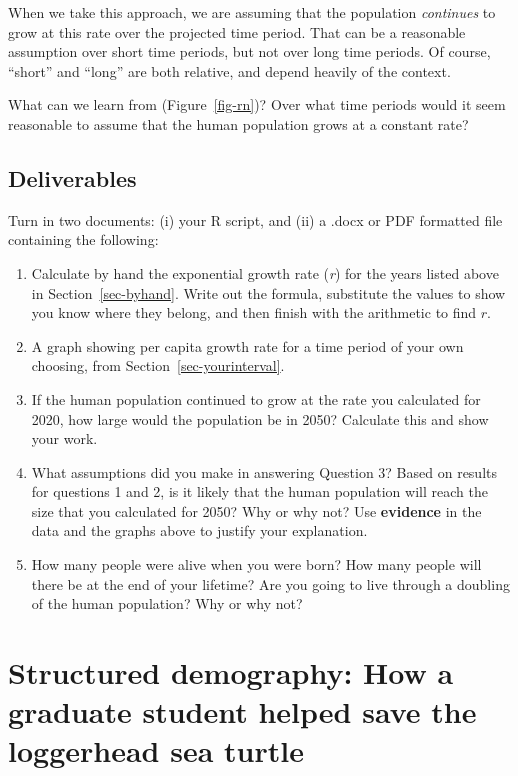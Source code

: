 \documentclass[
  letterpaper,
  DIV=11,
  numbers=noendperiod]{scrreprt}
\providecommand{\tightlist}{%
  \setlength{\itemsep}{0pt}\setlength{\parskip}{0pt}}
\begin{document}
When we take this approach, we are assuming that the population
\emph{continues} to grow at this rate over the projected time period.
That can be a reasonable assumption over short time periods, but not
over long time periods. Of course, ``short'' and ``long'' are both
relative, and depend heavily of the context.

What can we learn from (Figure~\ref{fig-rn})? Over what time periods
would it seem reasonable to assume that the human population grows at a
constant rate?

\section{Deliverables}\label{deliverables-6}

Turn in two documents: (i) your R script, and (ii) a .docx or PDF
formatted file containing the following:

\begin{enumerate}
\def\labelenumi{\arabic{enumi}.}
\tightlist
\item
  Calculate by hand the exponential growth rate (\emph{r}) for the years
  listed above in Section~\ref{sec-byhand}. Write out the formula,
  substitute the values to show you know where they belong, and then
  finish with the arithmetic to find \(r\).
\item
  A graph showing per capita growth rate for a time period of your own
  choosing, from Section~\ref{sec-yourinterval}.
\item
  If the human population continued to grow at the rate you calculated
  for 2020, how large would the population be in 2050? Calculate this
  and show your work.
\item
  What assumptions did you make in answering Question 3? Based on
  results for questions 1 and 2, is it likely that the human population
  will reach the size that you calculated for 2050? Why or why not? Use
  \textbf{evidence} in the data and the graphs above to justify your
  explanation.
\item
  How many people were alive when you were born? How many people will
  there be at the end of your lifetime? Are you going to live through a
  doubling of the human population? Why or why not?
\end{enumerate}


\chapter{Structured demography: How a graduate student helped save the
loggerhead sea
turtle}\label{structured-demography-how-a-graduate-student-helped-save-the-loggerhead-sea-turtle}
\end{document}
